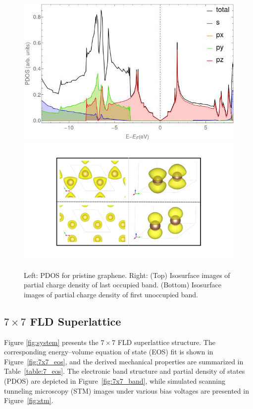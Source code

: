 \documentclass{article}
\begin{document}
\begin{figure}[H]
  \centering
  \includegraphics[scale=0.4]{../figures/pdos_pristine.jpeg}
  \includegraphics[scale=0.18]{../figures/parchg_pristine.png}
  \caption{Left: PDOS for pristine graphene. Right: (Top) Isosurface images of partial charge
  density of last occupied band. (Bottom) Isosurface images of partial charge density of first unoccupied band.}
  \label{fig:p_pdos}
\end{figure}

\subsection{\texorpdfstring{$7\times7$}{7x7} FLD Superlattice}
Figure \ref{fig:system} presents the $7 \times 7$ FLD superlattice structure. The corresponding energy--volume equation of state (EOS) fit is shown in Figure~\ref{fig:7x7_eos}, and the derived mechanical properties are summarized in Table~\ref{table:7_eos}. The electronic band structure and partial density of states (PDOS) are depicted in Figure~\ref{fig:7x7_band}, while simulated scanning tunneling microscopy (STM) images under various bias voltages are presented in Figure~\ref{fig:stm}.
\end{document}
